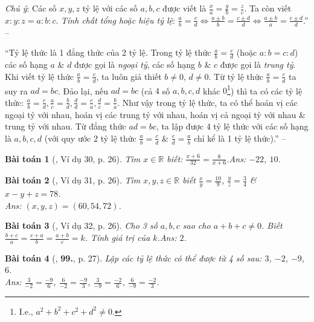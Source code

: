 \documentclass{article}
\newtheorem{baitoan}{Bài toán}
\begin{document}
	 \textit{Chú ý}: Các số $x,y,z$ tỷ lệ với các số $a,b,c$ được viết là $\frac{x}{a} = \frac{y}{b} = \frac{z}{c}$. Ta còn viết $x:y:z = a:b:c$.
	 \textit{Tính chất tổng hoặc hiệu tỷ lệ}: $\frac{a}{b} = \frac{c}{d}\Leftrightarrow\frac{a\pm b}{b} = \frac{c\pm d}{d}\Leftrightarrow\frac{a\pm b}{a} = \frac{c\pm d}{d}$.'' -- \cite[Chap. 2, \S5, pp. 25--26]{Tuyen_Toan_7}


``Tỷ lệ thức là 1 đẳng thức của 2 tỷ lệ. Trong tỷ lệ thức $\frac{a}{b} = \frac{c}{d}$ (hoặc $a:b = c:d$) các số hạng $a$ \& $d$ được gọi là \textit{ngoại tỷ}, các số hạng $b$ \& $c$ được gọi là \textit{trung tỷ}. Khi viết tỷ lệ thức $\frac{a}{b} = \frac{c}{d}$, ta luôn giả thiết $b\ne 0$, $d\ne 0$. Từ tỷ lệ thức $\frac{a}{b} = \frac{c}{d}$ ta suy ra $ad = bc$. Đảo lại, nếu $ad = bc$ (cả $4$ số $a,b,c,d$ khác $0$\footnote{I.e., $a^2 + b^2 + c^2 + d^2\ne 0$.}) thì ta có các tỷ lệ thức: $\frac{a}{b} = \frac{c}{d},\frac{a}{c} = \frac{b}{d},\frac{d}{d} = \frac{c}{a},\frac{d}{c} = \frac{b}{a}$. Như vậy trong tỷ lệ thức, ta có thể hoán vị các ngoại tỷ với nhau, hoán vị các trung tỷ với nhau, hoán vị cả ngoại tỷ với nhau \& trung tỷ với nhau. Từ đẳng thức $ad = bc$, ta lập được 4 tỷ lệ thức với các số hạng là $a,b,c,d$ (với quy ước 2 tỷ lệ thức $\frac{a}{b} = \frac{c}{d}$ \& $\frac{c}{d} = \frac{a}{b}$ chỉ kể là 1 tỷ lệ thức).'' -- \cite[\S6, p. 23]{Binh_Toan_7_tap_1}

\begin{baitoan}[\cite{Tuyen_Toan_7}, Ví dụ 30, p. 26]
	Tìm $x\in\mathbb{R}$ biết: $\frac{x + 6}{32} = \frac{8}{x + 6}$.\hfill{\sf Ans:} $-22$, $10$.
\end{baitoan}

\begin{baitoan}[\cite{Tuyen_Toan_7}, Ví dụ 31, p. 26]
	Tìm $x,y,z\in\mathbb{R}$ biết $\frac{x}{y} = \frac{10}{9}$, $\frac{y}{z} = \frac{3}{4}$ \& $x - y + z = 78$.\\\mbox{}\hfill{\sf Ans:} $(x,y,z) = (60,54,72)$.
\end{baitoan}

\begin{baitoan}[\cite{Tuyen_Toan_7}, Ví dụ 32, p. 26]
	Cho 3 số $a,b,c$ sao cho $a + b + c\ne 0$. Biết $\frac{b + c}{a} = \frac{c + a}{b} = \frac{a + b}{c} = k$. Tính giá trị của $k$.\hfill{\sf Ans:} $2$.
\end{baitoan}

\begin{baitoan}[\cite{Tuyen_Toan_7}, \textbf{99.}, p. 27]
	Lập các tỷ lệ thức có thể được từ 4 số sau: $3$, $-2$, $-9$, $6$.\\\mbox{}\hfill{\sf Ans:} $\frac{3}{-2} = \frac{-9}{6}$, $\frac{6}{-2} = \frac{-9}{3}$, $\frac{3}{-9} = \frac{-2}{6}$, $\frac{6}{-9} = \frac{-2}{3}$.
\end{baitoan}
\end{document}
